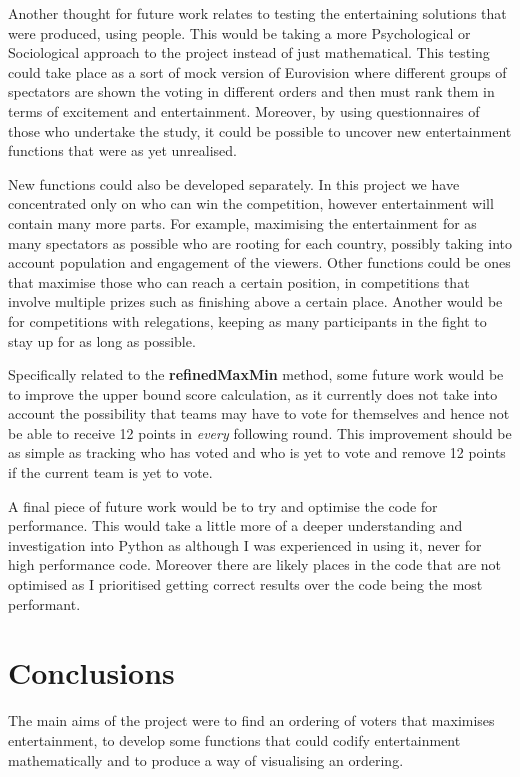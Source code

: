 \documentclass[12pt]{report}
\begin{document}
Another thought for future work relates to testing the entertaining solutions that were produced, using people. This would be taking a more Psychological or Sociological approach to the project instead of just mathematical. This testing could take place as a sort of mock version of Eurovision where different groups of spectators are shown the voting in different orders and then must rank them in terms of excitement and entertainment. Moreover, by using questionnaires of those who undertake the study, it could be possible to uncover new entertainment functions that were as yet unrealised.

New functions could also be developed separately. In this project we have concentrated only on who can win the competition, however entertainment will contain many more parts. For example, maximising the entertainment for as many spectators as possible who are rooting for each country, possibly taking into account population and engagement of the viewers. Other functions could be ones that maximise those who can reach a certain position, in competitions that involve multiple prizes such as finishing above a certain place. Another would be for competitions with relegations, keeping as many participants in the fight to stay up for as long as possible.

Specifically related to the \textbf{refinedMaxMin} method, some future work would be to improve the upper bound score calculation, as it currently does not take into account the possibility that teams may have to vote for themselves and hence not be able to receive 12 points in \textit{every} following round. This improvement should be as simple as tracking who has voted and who is yet to vote and remove 12 points if the current team is yet to vote.

A final piece of future work would be to try and optimise the code for performance. This would take a little more of a deeper understanding and investigation into Python as although I was experienced in using it, never for high performance code. Moreover there are likely places in the code that are not optimised as I prioritised getting correct results over the code being the most performant.

\section{Conclusions}\label{Conclusions}
The main aims of the project were to find an ordering of voters that maximises entertainment, to develop some functions that could codify entertainment mathematically and to produce a way of visualising an ordering.
\end{document}
